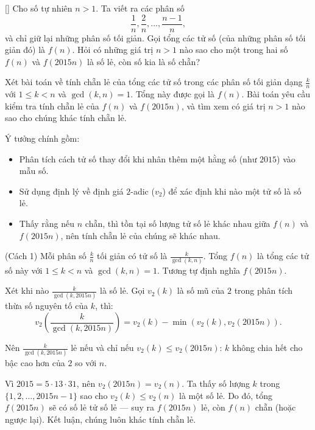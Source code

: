 \documentclass[../06-largest-exponent.tex]{subfiles}
\begin{document}
\begin{example*}\label{example:RUS-2015-MO-11-P2}[\textbf{}]
    Cho số tự nhiên \( n > 1 \). Ta viết ra các phân số
    \[
        \frac{1}{n}, \frac{2}{n}, \dots, \frac{n-1}{n},
    \]
    và chỉ giữ lại những phân số tối giản. Gọi tổng các tử số (của những phân số tối giản đó) là \( f(n) \).
    Hỏi có những giá trị \( n > 1 \) nào sao cho một trong hai số \( f(n) \) và \( f(2015n) \) là số lẻ, còn số kia là số chẵn?
\end{example*}

\begin{story*}
    Xét bài toán về tính chẵn lẻ của tổng các tử số trong các phân số tối giản dạng \( \frac{k}{n} \) với \( 1 \le k < n \) và \( \gcd(k,n) = 1 \). Tổng này được gọi là \( f(n) \). Bài toán yêu cầu kiểm tra tính chẵn lẻ của \( f(n) \) và \( f(2015n) \), và tìm xem có giá trị \( n > 1 \) nào sao cho chúng khác tính chẵn lẻ.

    Ý tưởng chính gồm:
    \begin{itemize}[topsep=0pt, partopsep=0pt, itemsep=0pt]
        \item Phân tích cách tử số thay đổi khi nhân thêm một hằng số (như \( 2015 \)) vào mẫu số.
        \item Sử dụng định lý về định giá \( 2 \)-adic (\( v_2 \)) để xác định khi nào một tử số là số lẻ.
        \item Thấy rằng nếu \( n \) chẵn, thì tồn tại số lượng tử số lẻ khác nhau giữa \( f(n) \) và \( f(2015n) \), nên tính chẵn lẻ của chúng sẽ khác nhau.
    \end{itemize}
\end{story*}

\begin{soln}(Cách 1)\footnotemark
    Mỗi phân số \( \frac{k}{n} \) tối giản có tử số là \( \frac{k}{\gcd(k, n)} \). Tổng \( f(n) \) là tổng các tử số này với \( 1 \le k < n \) và \( \gcd(k, n) = 1 \). Tương tự định nghĩa \( f(2015n) \).

    Xét khi nào \( \frac{k}{\gcd(k, 2015n)} \) là số lẻ. Gọi \( v_2(k) \) là số mũ của \( 2 \) trong phân tích thừa số nguyên tố của \( k \), thì:
    \[
        v_2\left( \frac{k}{\gcd(k, 2015n)} \right) = v_2(k) - \min\left( v_2(k), v_2(2015n) \right).
    \]

    Nên \( \frac{k}{\gcd(k, 2015n)} \) lẻ nếu và chỉ nếu \( v_2(k) \le v_2(2015n) \): \( k \) không chia hết cho bậc cao hơn của \( 2 \) so với \( n \).

    Vì \( 2015 = 5 \cdot 13 \cdot 31 \), nên \( v_2(2015n) = v_2(n) \). Ta thấy số lượng \( k \) trong \( \{1, 2, \dots, 2015n - 1\} \) sao cho \( v_2(k) \le v_2(n) \) là một số lẻ. Do đó, tổng \( f(2015n) \) sẽ có số lẻ tử số lẻ — suy ra \( f(2015n) \) lẻ, còn \( f(n) \) chẵn (hoặc ngược lại). Kết luận, chúng luôn khác tính chẵn lẻ.
\end{soln}
\end{document}
